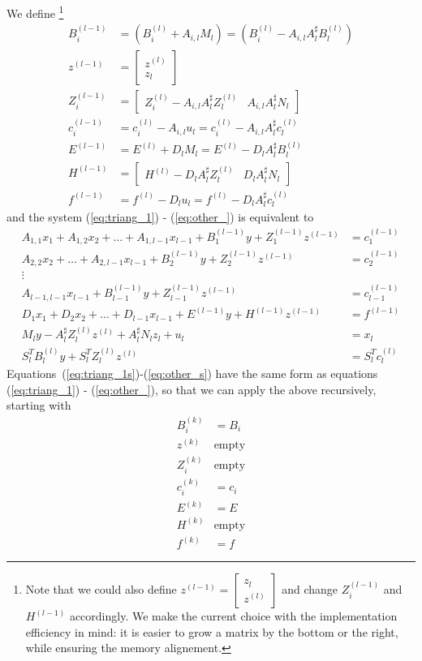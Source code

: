\documentclass[]{article}
\theoremstyle{definition}
\newcommand{\BIN}{\begin{bmatrix}}
\newcommand{\BOUT}{\end{bmatrix}}
\begin{document}
We define
\footnote{
Note that we could also define $z^{(l-1)} = \BIN z_l \\ z^{(l)} \BOUT$ and change $Z_i^{(l-1)}$ and $H^{(l-1)}$ accordingly. We make the current choice with the implementation efficiency in mind: it is easier to grow a matrix by the bottom or the right, while ensuring the memory alignement.
}
\begin{align*}
B_i^{(l-1)} &= (B_i^{(l)} + A_{i,l} M_l) = (B_i^{(l)} - A_{i,l} A_l^\sharp B_l^{(l)})\\
z^{(l-1)} &= \BIN z^{(l)}\\ z_l \BOUT\\
Z_i^{(l-1)} &= \BIN Z_i^{(l)} - A_{i,l} A_l^\sharp Z_l^{(l)} & A_{i,l} A_l^\sharp N_l\BOUT\\
c_i^{(l-1)} &= c_i^{(l)} - A_{i,l} u_l = c_i^{(l)} - A_{i,l} A_l^\sharp c_l^{(l)}\\
E^{(l-1)} &= E^{(l)} + D_l M_l = E^{(l)} - D_l A_l^\sharp B_l^{(l)}\\
H^{(l-1)} &= \BIN H^{(l)} - D_l A_l^\sharp Z_l^{(l)} & D_l A_l^\sharp N_l\BOUT\\
f^{(l-1)} &= f^{(l)} - D_l u_l = f^{(l)} - D_l A_l^\sharp c_l^{(l)}
\end{align*}
and the system (\ref{eq:triang_1}) - (\ref{eq:other_}) is equivalent to
\begin{align}
A_{1,1} x_1 + A_{1,2} x_2 + \ldots + A_{1,l-1} x_{l-1} + B_1^{(l-1)} y + Z_1^{(l-1)} z^{(l-1)}&= c_1^{(l-1)}  \label{eq:triang_1s}\\
A_{2,2} x_2 + \ldots + A_{2,l-1} x_{l-1} + B_2^{(l-1)} y + Z_2^{(l-1)} z^{(l-1)}&= c_2^{(l-1)}\\
\vdots& \nonumber\\
A_{l-1,l-1} x_{l-1} + B_{l-1}^{(l-1)} y + Z_{l-1}^{(l-1)} z^{(l-1)}&= c_{l-1}^{(l-1)}\\
D_1 x_1 + D_2 x_2 + \ldots + D_{l-1} x_{l-1} + E^{(l-1)} y + H^{(l-1)} z^{(l-1)}&= f^{(l-1)} \label{eq:other_s}\\
M_l y -A_l^\sharp Z_l^{(l)} z^{(l)} + A_l^\sharp N_l z_l + u_l &= x_l\\
	S_l^T B_l^{(l)} y + S_l^T Z_l^{(l)} z^{(l)} &= S_l^T c_l^{(l)}
\end{align}
Equations~(\ref{eq:triang_1s})-(\ref{eq:other_s}) have the same form as equations (\ref{eq:triang_1}) - (\ref{eq:other_}), so that we can apply the above recursively, starting with
\begin{align*}
B_i^{(k)} &= B_i\\
z^{(k)} &\mathrm{empty}\\
Z_i^{(k)} & \mathrm{empty}\\
c_i^{(k)} &= c_i\\
E^{(k)} &= E\\
H^{(k)} & \mathrm{empty} \\
f^{(k)} &= f
\end{align*}
\end{document}

